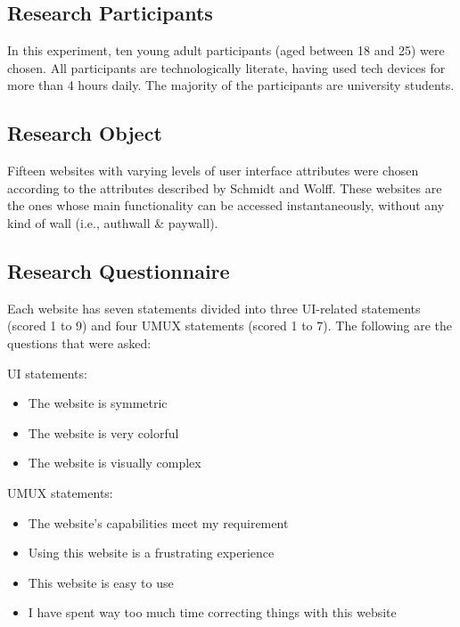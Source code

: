 \documentclass[conference]{IEEEtran}
\begin{document}
\subsection{Research Participants}

In this experiment, ten young adult participants (aged between 18 and 25) were chosen. All participants are technologically literate, having used tech devices for more than 4 hours daily. The majority of the participants are university students.

\subsection{Research Object}

Fifteen websites with varying levels of user interface attributes were chosen according to the attributes described by Schmidt and  Wolff\cite{SchmidtWolff+2018+41+55}. These websites are the ones whose main functionality can be accessed instantaneously, without any kind of wall (i.e., authwall \& paywall).

\subsection{Research Questionnaire}

Each website has seven statements divided into three UI-related statements (scored 1 to 9) and four UMUX statements (scored 1 to 7). The following are the questions that were asked:

UI statements:

\begin{itemize}
    \item The website is symmetric
    \item The website is very colorful
    \item The website is visually complex
\end{itemize}

UMUX statements:

\begin{itemize}
    \item The website's capabilities meet my requirement
    \item Using this website is a frustrating experience
    \item This website is easy to use
    \item I have spent way too much time correcting things with this website
\end{itemize}
\end{document}
